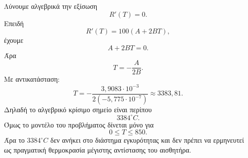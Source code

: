 \begin{alist}
  \item Λύνουμε αλγεβρικά την εξίσωση
        \[
          R'(T)=0.
        \]
        Επειδή
        \[
          R'(T)=100(A+2BT),
        \]
        έχουμε
        \[
          A+2BT=0.
        \]
        Άρα
        \[
          T=-\frac{A}{2B}.
        \]
        Με αντικατάσταση:
        \[
          T
          =
          -\frac{3{,}9083\cdot10^{-3}}
          {2(-5{,}775\cdot10^{-7})}
          \approx
          3383{,}81.
        \]
        Δηλαδή το αλγεβρικό κρίσιμο σημείο είναι περίπου
        \[
          {3384^\circ C}.
        \]
        Όμως το μοντέλο του προβλήματος δίνεται μόνο για
        \[
          0\leq T\leq850.
        \]
        Άρα το \(3384^\circ C\) δεν ανήκει στο διάστημα εγκυρότητας και
        δεν πρέπει να ερμηνευτεί ως πραγματική θερμοκρασία μέγιστης
        αντίστασης του αισθητήρα.
\end{alist}
